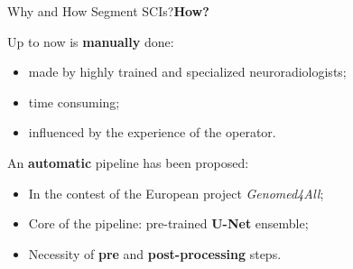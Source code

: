 \documentclass[]{standalone}
\begin{document}
	\begin{frame}{Why and How Segment SCIs?}{\textbf{How?}}
	\normalsize
	\vspace{-25pt}
		\begin{exampleblock}{Up to now is \textbf{manually} done:}
			\begin{itemize}
				\item made by highly trained and specialized neuroradiologists;
				\item time consuming;
				\item influenced by the experience of the operator.
			\end{itemize}
		\end{exampleblock}
		\vspace{10pt}
		\begin{block}{An \textbf{automatic} pipeline has been proposed:}
			\begin{itemize}
				\item In the contest of the European project \emph{Genomed4All};
				\item Core of the pipeline: pre-trained \textbf{U-Net} ensemble;
				\item Necessity of \textbf{pre} and \textbf{post-processing} steps.
			\end{itemize}
		\end{block}	
	\end{frame}
\end{document}
